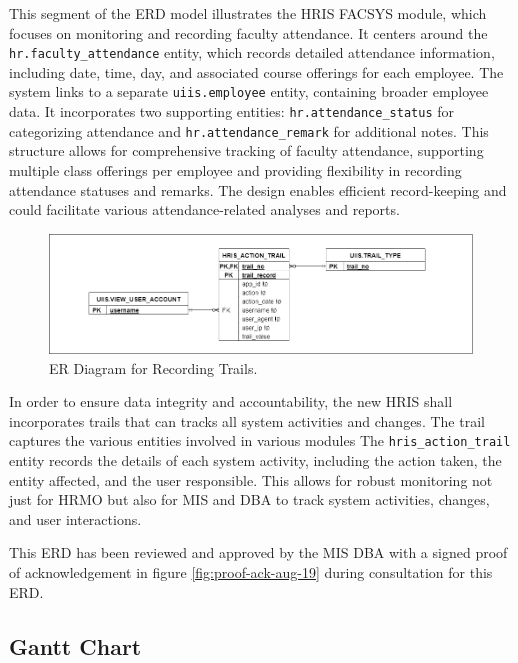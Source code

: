     This segment of the ERD model illustrates the HRIS FACSYS module, which focuses on monitoring and recording faculty attendance. It centers around the \texttt{hr.faculty\_attendance} entity, which records detailed attendance information, including date, time, day, and associated course offerings for each employee. The system links to a separate \texttt{uiis.employee} entity, containing broader employee data. It incorporates two supporting entities: \texttt{hr.attendance\_status} for categorizing attendance and \texttt{hr.attendance\_remark} for additional notes. This structure allows for comprehensive tracking of faculty attendance, supporting multiple class offerings per employee and providing flexibility in recording attendance statuses and remarks. The design enables efficient record-keeping and could facilitate various attendance-related analyses and reports.

    \begin{figure}[H]
        \centering
        \includegraphics[width=1\linewidth]{figures/images/diagrams/erd/erd-trails.png}
        \caption{ER Diagram for Recording Trails.}
        \label{fig:erd-trails}
    \end{figure}

    In order to ensure data integrity and accountability, the new HRIS shall incorporates trails that can tracks all system activities and changes. The trail captures the various entities involved in various modules The \texttt{hris\_action\_trail} entity records the details of each system activity, including the action taken, the entity affected, and the user responsible. This allows for robust monitoring not just for HRMO but also for MIS and DBA to track system activities, changes, and user interactions. 

    This ERD has been reviewed and approved by the MIS DBA with a signed proof of acknowledgement in figure \ref{fig:proof-ack-aug-19} during consultation for this ERD. 
    
    \subsection{Gantt Chart}
    
